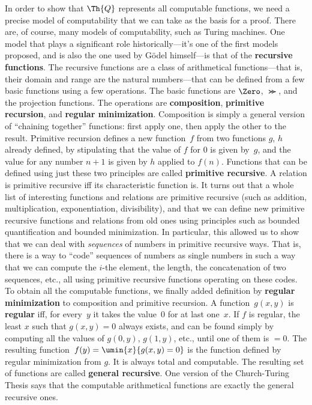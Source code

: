 In order to show that $\Th{Q}$ represents all computable functions, we
need a precise model of computability that we can take as the basis
for a proof.  There are, of course, many models of computability, such
as Turing machines. One model that plays a significant role
historically---it's one of the first models proposed, and is also the
one used by G\"odel himself---is that of the \textbf{recursive
  functions}.  The recursive functions are a class of arithmetical
functions---that is, their domain and range are the natural
numbers---that can be defined from a few basic functions using a few
operations. The basic functions are $\Zero$, $\Succ$, and the
projection functions. The operations are \textbf{composition},
\textbf{primitive recursion}, and \textbf{regular
  minimization}. Composition is simply a general version of ``chaining
together'' functions: first apply one, then apply the other to the
result. Primitive recursion defines a new function~$f$ from two
functions $g$, $h$ already defined, by stipulating that the value of
$f$ for $0$ is given by~$g$, and the value for any number $n+1$ is
given by $h$ applied to $f(n)$.  Functions that can be defined using
just these two principles are called \textbf{primitive recursive}. A
relation is primitive recursive iff its characteristic function is. It
turns out that a whole list of interesting functions and relations are
primitive recursive (such as addition, multiplication, exponentiation,
divisibility), and that we can define new primitive recursive
functions and relations from old ones using principles such as bounded
quantification and bounded minimization. In particular, this allowed
us to show that we can deal with \emph{sequences} of numbers in
primitive recursive ways. That is, there is a way to ``code''
sequences of numbers as single numbers in such a way that we can
compute the $i$-the element, the length, the concatenation of two
sequences, etc., all using primitive recursive functions operating on
these codes.  To obtain all the computable functions, we finally added
definition by \textbf{regular minimization} to composition and
primitive recursion.  A function~$g(x, y)$ is \textbf{regular} iff,
for every~$y$ it takes the value~$0$ for at last one~$x$. If $f$ is
regular, the least $x$ such that $g(x, y) = 0$ always exists, and can
be found simply by computing all the values of $g(0, y)$, $g(1, y)$,
etc., until one of them is $= 0$. The resulting function~$f(y) =
\umin{x}{g(x, y) = 0}$ is the function defined by regular minimization
from $g$. It is always total and computable. The resulting set of
functions are called \textbf{general recursive}.  One version of the
Church-Turing Thesis says that the computable arithmetical functions
are exactly the general recursive ones.

